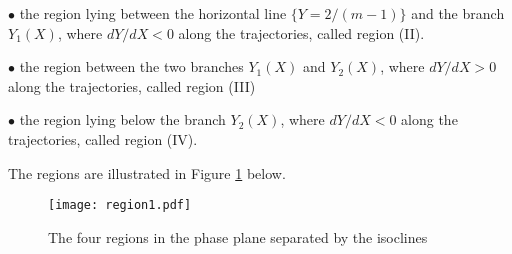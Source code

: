 \documentclass[a4paper,11pt]{article}
\numberwithin{equation}{section}
\begin{document}
$\bullet$ the region lying between the horizontal line $\{Y=2/(m-1)\}$ and the branch $Y_1(X)$, where $dY/dX<0$ along the trajectories, called region (II).

$\bullet$ the region between the two branches $Y_1(X)$ and $Y_2(X)$, where $dY/dX>0$ along the trajectories, called region (III)

$\bullet$ the region lying below the branch $Y_2(X)$, where $dY/dX<0$ along the trajectories, called region (IV).

The regions are illustrated in Figure \ref{fig1} below.

\begin{figure}[ht!]
  \begin{center}
  \texttt{[image: region1.pdf]}
  \end{center}
  \caption{The four regions in the phase plane separated by the isoclines}\label{fig1}
\end{figure}
\end{document}

